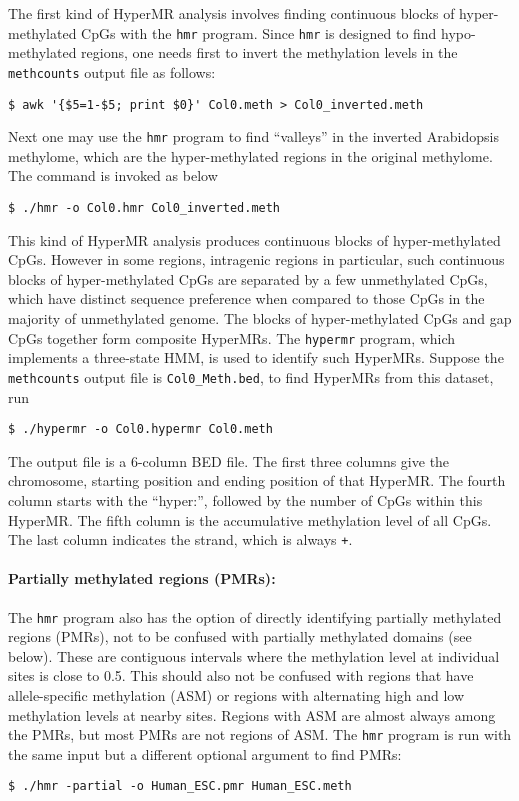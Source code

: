 \documentclass[10pt]{article}
\newcommand{\prog}[1]{\texttt{#1}}
\newcommand{\fn}[1]{\texttt{#1}}
\newcommand{\lit}[1]{\texttt{#1}}
\begin{document}
The first kind of HyperMR analysis involves finding continuous blocks
of hyper-methylated CpGs with the \prog{hmr} program. Since \prog{hmr}
is designed to find hypo-methylated regions, one needs first to invert
the methylation levels in the \prog{methcounts} output file as
follows:
\begin{verbatim}
$ awk '{$5=1-$5; print $0}' Col0.meth > Col0_inverted.meth
\end{verbatim}
Next one may use the \prog{hmr} program to find ``valleys'' in the
inverted Arabidopsis methylome, which are the hyper-methylated regions
in the original methylome. The command is invoked as below
\begin{verbatim}
$ ./hmr -o Col0.hmr Col0_inverted.meth
\end{verbatim}

This kind of HyperMR analysis produces continuous blocks of
hyper-methylated CpGs. However in some regions, intragenic regions in
particular, such continuous blocks of hyper-methylated CpGs are
separated by a few unmethylated CpGs, which have distinct sequence
preference when compared to those CpGs in the majority of unmethylated
genome. The blocks of hyper-methylated CpGs and gap CpGs together form
composite HyperMRs. The \prog{hypermr} program, which implements a
three-state HMM, is used to identify such HyperMRs. Suppose the
\prog{methcounts} output file is \fn{Col0\_Meth.bed}, to find HyperMRs
from this dataset, run
\begin{verbatim}
$ ./hypermr -o Col0.hypermr Col0.meth
\end{verbatim}
The output file is a 6-column BED file. The first three columns give
the chromosome, starting position and ending position of that
HyperMR. The fourth column starts with the ``hyper:'', followed by the
number of CpGs within this HyperMR. The fifth column is the
accumulative methylation level of all CpGs. The last column indicates
the strand, which is always \lit{+}.

\paragraph{Partially methylated regions (PMRs):}
The \prog{hmr} program also has the option of directly identifying
partially methylated regions (PMRs), not to be confused with partially
methylated domains (see below). These are contiguous intervals where
the methylation level at individual sites is close to 0.5. This should
also not be confused with regions that have allele-specific
methylation (ASM) or regions with alternating high and low methylation
levels at nearby sites. Regions with ASM are almost always among the
PMRs, but most PMRs are not regions of ASM. The \prog{hmr} program is
run with the same input but a different optional argument to find
PMRs:
\begin{verbatim}
$ ./hmr -partial -o Human_ESC.pmr Human_ESC.meth
\end{verbatim}
\end{document}
